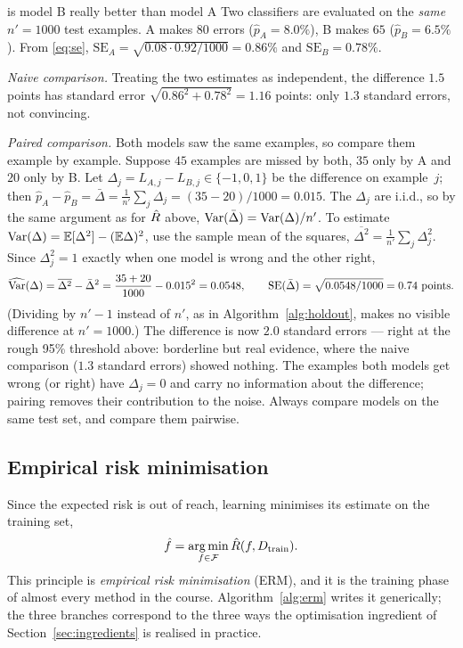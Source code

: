 \documentclass[11pt]{article}
\begin{document}
\begin{worked}{is model B really better than model A}
Two classifiers are evaluated on the \emph{same} $n' = 1000$ test examples. A makes $80$ errors ($\hat p_A = 8.0\%$),
B makes $65$ ($\hat p_B = 6.5\%$). From \eqref{eq:se}, $\mathrm{SE}_A = \sqrt{0.08 \cdot 0.92/1000} = 0.86\%$ and
$\mathrm{SE}_B = 0.78\%$.

\emph{Naive comparison.} Treating the two estimates as independent, the difference $1.5$ points has standard error
$\sqrt{0.86^2 + 0.78^2} = 1.16$ points: only $1.3$ standard errors, not convincing.

\emph{Paired comparison.} Both models saw the same examples, so compare them example by example. Suppose $45$ examples
are missed by both, $35$ only by A and $20$ only by B. Let $\Delta_j = L_{A,j} - L_{B,j} \in \{-1, 0, 1\}$ be the
difference on example~$j$; then $\hat p_A - \hat p_B = \bar\Delta = \frac{1}{n'}\sum_j \Delta_j = (35 - 20)/1000 =
0.015$. The $\Delta_j$ are i.i.d., so by the same argument as for $\hat R$ above, $\operatorname{Var}(\bar\Delta) =
\operatorname{Var}(\Delta)/n'$. To estimate $\operatorname{Var}(\Delta) = \mathbb{E}[\Delta^2] - (\mathbb{E}\Delta)^2$, use the sample mean of the squares,
$\overline{\Delta^2} = \frac{1}{n'}\sum_j \Delta_j^2$. Since $\Delta_j^2 = 1$ exactly when one model is wrong and the
other right,
\[
  \widehat{\operatorname{Var}}(\Delta) = \overline{\Delta^2} - \bar\Delta^2 = \frac{35 + 20}{1000} - 0.015^2 = 0.0548,
  \qquad \mathrm{SE}(\bar\Delta) = \sqrt{0.0548/1000} = 0.74 \text{ points}.
\]
(Dividing by $n' - 1$ instead of $n'$, as in Algorithm~\ref{alg:holdout}, makes no visible difference at $n' = 1000$.)
The difference is now $2.0$ standard errors --- right at the rough 95\% threshold above: borderline but real evidence,
where the naive comparison ($1.3$ standard errors) showed nothing. The examples both models get wrong (or right)
have $\Delta_j = 0$ and carry no information about the difference; pairing removes their contribution to the noise. Always compare models on the same test set, and
compare them pairwise.
\end{worked}

\subsection{Empirical risk minimisation}

Since the expected risk is out of reach, learning minimises its estimate on the training set,
\[
  \hat f = \operatorname*{arg\,min}_{f \in \mathcal{F}} \hat R(f, D_{\mathrm{train}}).
\]
This principle is \emph{empirical risk minimisation} (ERM), and it is the training phase of almost every method in
the course. Algorithm~\ref{alg:erm} writes it generically; the three branches correspond to the three ways the
optimisation ingredient of Section~\ref{sec:ingredients} is realised in practice.
\end{document}
